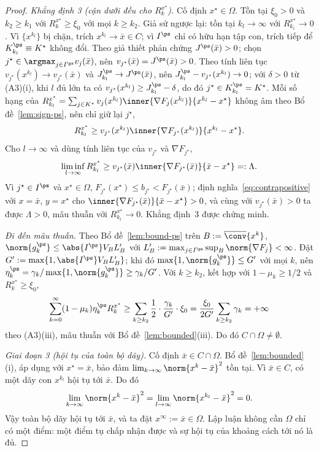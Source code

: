 \begin{proof}
\smallskip
\emph{Khẳng định 3 (cận dưới đều cho $R^{x^\star}_k$).} Cố định $x^\star\in\Omega$. Tồn tại
$\xi_0>0$ và $k_2\ge k_1$ với $R^{x^\star}_k\ge\xi_0$ với mọi $k\ge k_2$. Giả sử
ngược lại: tồn tại $k_l\to\infty$ với $R^{x^\star}_{k_l}\to0$. Vì $\{x^{k_l}\}$ bị chặn,
trích $x^{k_l}\to\bar x\in C$; vì $I^{\ps}$ chỉ có hữu hạn tập con, trích tiếp
để $K^{\ps}_{k_l}\equiv K^\star$ không đổi. Theo giả thiết phản chứng
$J^{\ps}(\bar x)>0$; chọn $j^\star\in\argmax_{j\in I^{\ps}}v_j(\bar x)$, nên
$v_{j^\star}(\bar x)=J^{\ps}(\bar x)>0$. Theo tính liên tục $v_{j^\star}(x^{k_l})\to
v_{j^\star}(\bar x)$ và $J^{\ps}_{k_l}\to J^{\ps}(\bar x)$, nên
$J^{\ps}_{k_l}-v_{j^\star}(x^{k_l})\to0$; với $\delta>0$ từ (A3)(i), khi $l$ đủ lớn ta
có $v_{j^\star}(x^{k_l})\ge J^{\ps}_{k_l}-\delta$, do đó $j^\star\in K^{\ps}_{k_l}=K^\star$.
Mỗi số hạng của
$R^{x^\star}_{k_l}=\sum_{j\in K^\star}v_j(x^{k_l})\inner{\nabla F_j(x^{k_l})}{x^{k_l}-x^\star}$
không âm theo Bổ đề~\ref{lem:sign-ps}, nên chỉ giữ lại $j^\star$,
\[
R^{x^\star}_{k_l}\ge v_{j^\star}(x^{k_l})\inner{\nabla F_{j^\star}(x^{k_l})}{x^{k_l}-x^\star}.
\]
Cho $l\to\infty$ và dùng tính liên tục của $v_{j^\star}$ và $\nabla F_{j^\star}$,
\[
\liminf_{l\to\infty}R^{x^\star}_{k_l}\ge v_{j^\star}(\bar x)\inner{\nabla F_{j^\star}(\bar x)}{\bar x-x^\star}=:\Lambda .
\]
Vì $j^\star\in I^{\ps}$ và $x^\star\in\Omega$, $F_{j^\star}(x^\star)\le b_{j^\star}<F_{j^\star}(\bar x)$;
định nghĩa~\eqref{eq:contrapositive} với $x=\bar x$, $y=x^\star$ cho
$\inner{\nabla F_{j^\star}(\bar x)}{\bar x-x^\star}>0$, và cùng với $v_{j^\star}(\bar x)>0$ ta
được $\Lambda>0$, mâu thuẫn với $R^{x^\star}_{k_l}\to0$. Khẳng định~3 được chứng minh.

\smallskip
\emph{Đi đến mâu thuẫn.} Theo Bổ đề~\ref{lem:bound-ps} trên
$B:=\overline{\conv}\{x^k\}$, $\norm{g^{\ps}_k}\le\abs{I^{\ps}}V_B L'_B$ với
$L'_B:=\max_{j\in I^{\ps}}\sup_B\norm{\nabla F_j}<\infty$. Đặt
$G':=\max\{1,\abs{I^{\ps}}V_B L'_B\}$; khi đó $\max\{1,\norm{g^{\ps}_k}\}\le G'$ với mọi $k$,
nên $\eta^{\ps}_k=\gamma_k/\max\{1,\norm{g^{\ps}_k}\}\ge\gamma_k/G'$. Với $k\ge k_2$,
kết hợp với $1-\mu_k\ge1/2$ và $R^{x^\star}_k\ge\xi_0$,
\[
\sum_{k=0}^\infty(1-\mu_k)\eta^{\ps}_k R^{x^\star}_k\ge\sum_{k\ge k_2}\frac12\cdot\frac{\gamma_k}{G'}\cdot\xi_0=\frac{\xi_0}{2G'}\sum_{k\ge k_2}\gamma_k=+\infty
\]
theo (A3)(iii), mâu thuẫn với Bổ đề~\ref{lem:bounded}(iii). Do đó $C\cap\Omega\ne\emptyset$.

\emph{Giai đoạn 3 (hội tụ của toàn bộ dãy).} Cố định $\bar x\in C\cap\Omega$.
Bổ đề~\ref{lem:bounded}(i), áp dụng với $x^\star=\bar x$, bảo đảm
$\lim_{k\to\infty}\norm{x^k-\bar x}^2$ tồn tại. Vì $\bar x\in C$, có một dãy con
$x^{k_l}$ hội tụ tới $\bar x$. Do đó
\[
\lim_{k\to\infty}\norm{x^k-\bar x}^2
=\lim_{l\to\infty}\norm{x^{k_l}-\bar x}^2=0.
\]
Vậy toàn bộ dãy hội tụ tới $\bar x$, và ta đặt $x^\infty:=\bar x\in\Omega$.
Lập luận không cần $\Omega$ chỉ có một điểm: một điểm tụ chấp nhận được và
sự hội tụ của khoảng cách tới nó là đủ.
\end{proof}

